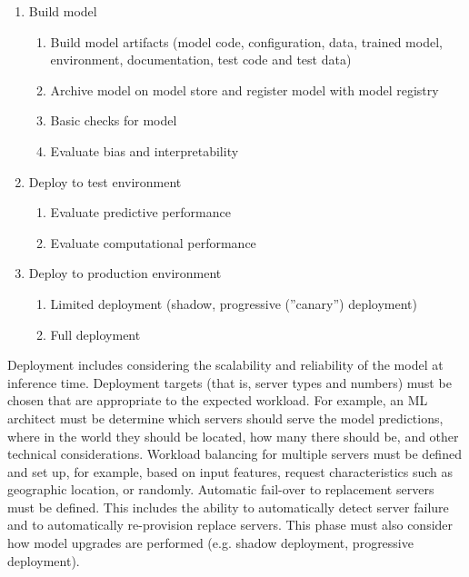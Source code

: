 \begin{samepage}
\begin{enumerate}
\item Build model
\begin{enumerate}
   \item Build model artifacts (model code, configuration, data, trained model, environment, documentation, test code and test data)
   \item Archive model on model store and register model with model registry
   \item Basic checks for model
   \item Evaluate bias and interpretability 
\end{enumerate}
\item Deploy to test environment
\begin{enumerate}
    \item Evaluate predictive performance
    \item Evaluate computational performance
\end{enumerate}
\item Deploy to production environment
\begin{enumerate}
   \item Limited deployment (shadow, progressive (''canary'') deployment)
   \item Full deployment
\end{enumerate}
\end{enumerate} 
\end{samepage}

Deployment includes considering the scalability and reliability of the model at inference time. Deployment targets (that is, server types and numbers) must be chosen that are appropriate to the expected workload. For example, an ML architect must be determine which servers should serve the model predictions, where in the world they should be located, how many there should be, and other technical considerations. Workload balancing for multiple servers must be defined and set up, for example, based on input features, request characteristics such as geographic location, or randomly. Automatic fail-over to replacement servers must be defined. This includes the ability to automatically detect server failure and to automatically re-provision replace servers. This phase must also consider how model upgrades are performed (e.g. shadow deployment, progressive deployment).

